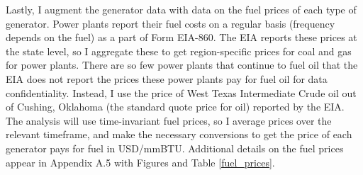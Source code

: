 Lastly, I augment the generator data with data on the fuel prices of each type of generator. Power plants report their fuel costs on a regular basis (frequency depends on the fuel) as a part of Form EIA-860. The EIA reports these prices at the state level, so I aggregate these to get region-specific prices for coal and gas for power plants. There are so few power plants that continue to fuel oil that the EIA does not report the prices these power plants pay for fuel oil for data confidentiality. Instead, I use the price of West Texas Intermediate Crude oil out of Cushing, Oklahoma (the standard quote price for oil) reported by the EIA. The analysis will use time-invariant fuel prices, so I average prices over the relevant timeframe, and make the necessary conversions to get the price of each generator pays for fuel in USD/mmBTU. Additional details on the fuel prices appear in Appendix A.5 with Figures and Table \ref{fuel_prices}.

